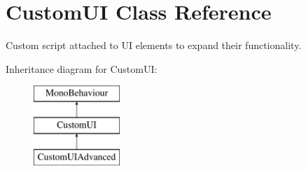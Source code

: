 \hypertarget{class_custom_u_i}{}\section{Custom\+U\+I Class Reference}
\label{class_custom_u_i}


Custom script attached to U\+I elements to expand their functionality.  


Inheritance diagram for Custom\+U\+I\+:\begin{figure}[H]
\begin{center}
\leavevmode
\includegraphics[height=3.000000cm]{class_custom_u_i}
\end{center}
\end{figure}

